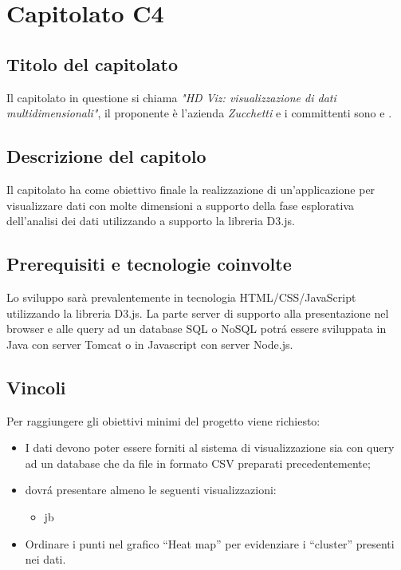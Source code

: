 \section{Capitolato C4}
\subsection{Titolo del capitolato}
Il capitolato in questione si chiama \textit{"HD Viz: visualizzazione di dati multidimensionali"}, il proponente \`e l'azienda \textit{Zucchetti} e i committenti sono \VT{} e \CR{}.

\subsection{Descrizione del capitolo}
Il capitolato ha come obiettivo finale la realizzazione di un'applicazione per visualizzare dati con molte dimensioni a supporto della fase esplorativa dell'analisi dei dati utilizzando a supporto la libreria D3.js.

\subsection{Prerequisiti e tecnologie coinvolte}
Lo sviluppo sarà prevalentemente in tecnologia HTML/CSS/JavaScript utilizzando la libreria D3.js.
La parte server di supporto alla presentazione nel browser e alle query ad un database SQL o NoSQL potr\'a essere sviluppata in Java con server Tomcat o in Javascript con server Node.js.

\subsection{Vincoli}
Per raggiungere gli obiettivi minimi del progetto viene richiesto:

\begin{itemize}
\item I dati devono poter essere forniti al sistema di visualizzazione sia con query ad un database che da file in formato CSV preparati precedentemente;
\item dovr\'a presentare almeno le seguenti visualizzazioni:
\begin{itemize}
\item jb
\end{itemize}
\item Ordinare i punti nel grafico “Heat map” per evidenziare i “cluster” presenti nei dati.
\end{itemize}

